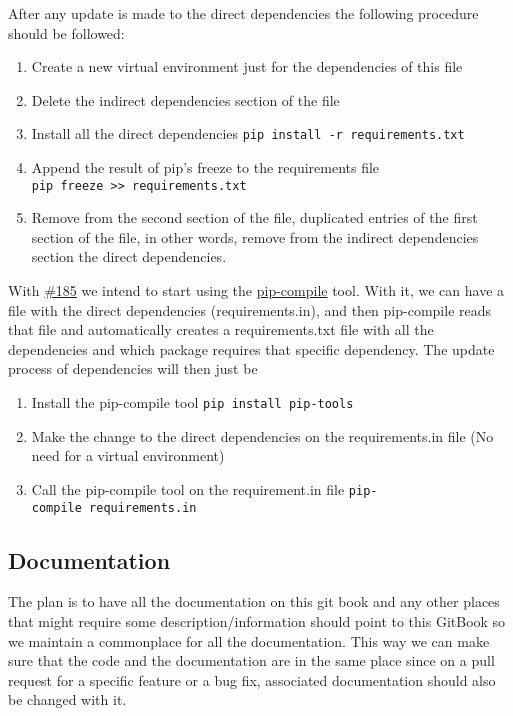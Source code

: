 \documentclass[
]{book}
\providecommand{\tightlist}{%
  \setlength{\itemsep}{0pt}\setlength{\parskip}{0pt}}
\begin{document}
After any update is made to the direct dependencies the following procedure should be followed:

\begin{enumerate}
\def\labelenumi{\arabic{enumi}.}
\tightlist
\item
  Create a new virtual environment just for the dependencies of this file
\item
  Delete the indirect dependencies section of the file
\item
  Install all the direct dependencies \texttt{pip\ install\ -r\ requirements.txt}
\item
  Append the result of pip's freeze to the requirements file \texttt{pip\ freeze\ \textgreater{}\textgreater{}\ requirements.txt}
\item
  Remove from the second section of the file, duplicated entries of the first section of the file, in other words, remove from the indirect dependencies section the direct dependencies.
\end{enumerate}

With \href{https://github.com/EHDEN/NetworkDashboards/pull/185}{\#185} we intend to start using the \href{https://github.com/jazzband/pip-tools}{pip-compile} tool.
With it, we can have a file with the direct dependencies (requirements.in), and then pip-compile reads that file and automatically creates a requirements.txt file with all the dependencies and which package requires that specific dependency.
The update process of dependencies will then just be

\begin{enumerate}
\def\labelenumi{\arabic{enumi}.}
\tightlist
\item
  Install the pip-compile tool \texttt{pip\ install\ pip-tools}
\item
  Make the change to the direct dependencies on the requirements.in file (No need for a virtual environment)
\item
  Call the pip-compile tool on the requirement.in file \texttt{pip-compile\ requirements.in}
\end{enumerate}

\hypertarget{documentation}{%
\subsection*{Documentation}\label{documentation}}

The plan is to have all the documentation on this git book and any other places that might require some description/information should point to this GitBook so we maintain a commonplace for all the documentation.
This way we can make sure that the code and the documentation are in the same place since on a pull request for a specific feature or a bug fix, associated documentation should also be changed with it.
\end{document}
